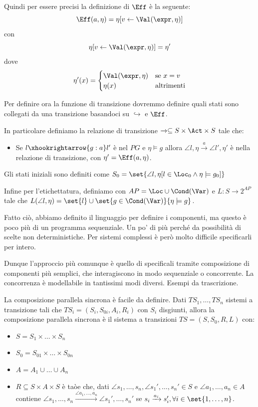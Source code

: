 Quindi per essere precisi la definizione di \(\Eff\) è la seguente:
\[\Eff(a,\eta)=\eta[v\leftarrow \Val(\expr, \eta)]\]
con
\[\eta[v\leftarrow \Val(\expr,\eta)] = \eta'\]
dove
\[\eta' (x)= \begin{cases}
    \Val(\expr,\eta) & \text{se } x = v  \\
    \eta(x)          & \text{altrimenti}
  \end{cases}\]

Per definire ora la funzione di transizione dovremmo definire quali stati sono collegati da una transizione basandoci su \(\hookrightarrow\) e \(\Eff\).

In particolare definiamo la relazione di transizione \(\xrightarrow{} \subseteq S \times \Act \times S\) tale che:
\begin{itemize}
  \item Se \(l \xhookrightarrow{g:a} l' \) è nel \(PG\) e \(\eta \models g\) allora \(\angle{l,\eta} \xrightarrow{a} \angle{l',\eta'}\) è nella relazione di transizione, con \(\eta' = \Eff(a,\eta)\).
\end{itemize}

Gli stati iniziali sono definiti come \(S_0 = \set{\angle{l, \eta}[l \in \Loc_0 \land \eta \models g_0]}\)

Infine per l'etichettatura, definiamo con \(AP = \Loc \cup \Cond(\Var)\) e \(L : S \to 2^{AP}\) tale che \(L(\angle{l,\eta}) = \set{l} \cup \set{g \in \Cond(\Var)}{\eta \models g}\).

Fatto ciò, abbiamo definito il linguaggio per definire i componenti, ma questo è poco più di un programma sequenziale. Un po' di più perché da possibilità di scelte non deterministiche.
Per sistemi complessi è però molto difficile specificarli per intero.

Dunque l'approccio più comunque è quello di specificali tramite composizione di componenti più semplici, che interagiscono in modo sequenziale o concorrente.
La concorrenza è modellabile in tantissimi modi diversi. Esempi da trascrizione.

La composizione parallela sincrona è facile da definire. Dati \(TS_1, \ldots, TS_n\) sistemi a transizione tali che \(TS_i = (S_i, S_{0i}, A_i, R_i)\) con \(S_i\) disgiunti, allora la composizione parallela sincrona è il sistema a transizioni \(TS = (S,S_0,R,L)\) con:
\begin{itemize}
  \item \(S = S_1 \times \ldots \times S_n\)
  \item \(S_0 = S_{01} \times \ldots \times S_{0n}\)
  \item \(A = A_1 \cup \ldots \cup A_n\)
  \item \(R \subseteq S \times A \times S\) è taòe che, dati \(\angle{s_1, \ldots, s_n}, \angle{s_1', \ldots, s_n'} \in S\) e \(\angle{a_1,\ldots, a_n} \in A\) contiene \(\angle{s_1,\ldots,s_n}\xrightarrow{\angle{a_1,\ldots,a_n}}\angle{s_1',\ldots,s_n'}\) se \(s_i \xrightarrow{a_i} s_i', \forall i \in \set{1,\ldots,n}\).
\end{itemize}


